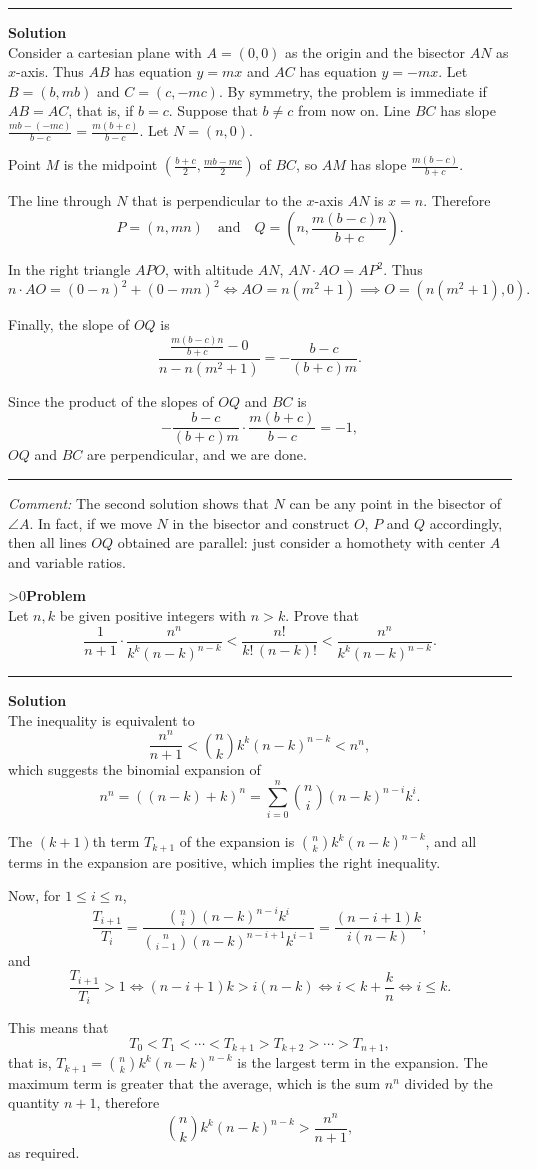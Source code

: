 \documentclass[12pt,oneside,a4paper]{book}
\newcounter{probnum}
\newcounter{solnum}
\newcommand{\prob}{\ifnum\value{probnum}>0\newpage\fi\setcounter{solnum}{0}\stepcounter{probnum}\textbf{Problem \theprobnum}\\}
\newcommand{\comment}{\medskip\hrule\medbreak\emph{Comment: }}
\newcommand{\sol}{\medskip\hrule\medbreak\textbf{Solution}\\}
\newcommand{\soln}{\stepcounter{solnum}\medskip\hrule\medbreak\textbf{Solution \thesolnum}\\}
\begin{document}
\soln
Consider a cartesian plane with $A=(0,0)$ as the origin and the bisector $AN$ as $x$-axis. Thus $AB$ has equation $y=mx$ and $AC$ has equation $y=-mx$. Let $B = (b,mb)$ and $C = (c,-mc)$. By symmetry, the problem is immediate if $AB=AC$, that is, if $b=c$. Suppose that $b\ne c$ from now on. Line $BC$ has slope $\frac{mb-(-mc)}{b-c} = \frac{m(b+c)}{b-c}$. Let $N = (n,0)$.

Point $M$ is the midpoint $\left(\frac{b+c}2,\frac{mb-mc}2\right)$ of $BC$, so $AM$ has slope $\frac{m(b-c)}{b+c}$.

The line through $N$ that is perpendicular to the $x$-axis $AN$ is $x=n$. Therefore
\[P = (n,mn)\quad\text{and}\quad Q = \left(n,\frac{m(b-c)n}{b+c}\right).\]

In the right triangle $APO$, with altitude $AN$, $AN\cdot AO = AP^2$. Thus
\[n\cdot AO = (0-n)^2 + (0-mn)^2 \iff AO = n(m^2+1)\implies O = (n(m^2+1),0).\]

Finally, the slope of $OQ$ is
\[\frac{\frac{m(b-c)n}{b+c} - 0}{n - n(m^2+1)} = -\frac{b-c}{(b+c)m}.\]

Since the product of the slopes of $OQ$ and $BC$ is
\[-\frac{b-c}{(b+c)m}\cdot\frac{m(b+c)}{b-c}=-1,\]
$OQ$ and $BC$ are perpendicular, and we are done.

\comment
The second solution shows that $N$ can be any point in the bisector of $\angle A$. In fact, if we move $N$ in the bisector and construct $O$, $P$ and $Q$ accordingly, then all lines $OQ$ obtained are parallel: just consider a homothety with center $A$ and variable ratios.

\prob Let $n,k$ be given positive integers with $n>k$. Prove that
\[\frac1{n+1}\cdot \frac{n^n}{k^k(n-k)^{n-k}} < \frac{n!}{k!\,(n-k)!} < \frac{n^n}{k^k(n-k)^{n-k}}.\]

\sol
The inequality is equivalent to
\[\frac{n^n}{n+1} < \binom nk k^k(n-k)^{n-k} < n^n,\]
which suggests the binomial expansion of
\[n^n = ((n-k)+k)^n = \sum_{i=0}^n \binom ni (n-k)^{n-i}k^i.\]

The $(k+1)$th term $T_{k+1}$ of the expansion is $\binom nk k^k(n-k)^{n-k}$, and all terms in the expansion are positive, which implies the right inequality.

Now, for $1\le i\le n$,
\[\frac{T_{i+1}}{T_i} = \frac{\binom ni (n-k)^{n-i}k^i}{\binom n{i-1} (n-k)^{n-i+1}k^{i-1}}
= \frac{(n-i+1)k}{i(n-k)},\]
and
\[\frac{T_{i+1}}{T_i} > 1 \iff (n-i+1)k > i(n-k)\iff i < k + \frac kn\iff i\le k.\]

This means that
\[T_0 < T_1 < \cdots < T_{k+1} > T_{k+2} > \cdots > T_{n+1},\]
that is, $T_{k+1} = \binom nk k^k(n-k)^{n-k}$ is the largest term in the expansion. The maximum term is greater that the average, which is the sum $n^n$ divided by the quantity $n+1$, therefore
\[\binom nk k^k(n-k)^{n-k} > \frac{n^n}{n+1},\]
as required.
\end{document}

